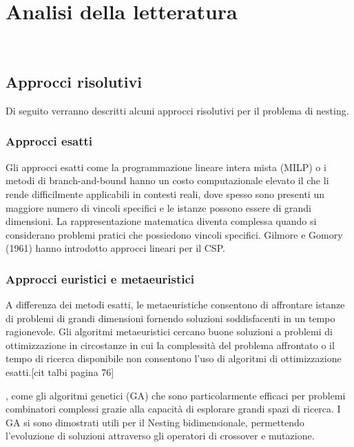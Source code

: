 \chapter{Analisi della letteratura}
\label{cap:descrizione-stage}

\\

\section{Approcci risolutivi}

Di seguito verranno descritti alcuni approcci risolutivi per il problema di nesting. 

\subsection{Approcci esatti}

Gli approcci esatti come la programmazione lineare intera mista (MILP) o i metodi di branch-and-bound hanno un costo computazionale elevato il che li rende difficilmente applicabili in contesti reali, dove spesso sono presenti un maggiore numero di vincoli specifici e le istanze possono essere di grandi dimensioni. La rappresentazione matematica diventa complessa quando si considerano problemi pratici che possiedono vincoli specifici.
Gilmore e Gomory (1961) hanno introdotto approcci lineari per il CSP.

\subsection{Approcci euristici e metaeuristici}

A differenza dei metodi esatti, le metaeuristiche consentono di affrontare istanze di problemi di grandi dimensioni fornendo soluzioni soddisfacenti in un tempo ragionevole. Gli algoritmi metaeuristici cercano buone soluzioni a problemi di ottimizzazione in circostanze in cui la complessità del problema affrontato o il tempo di ricerca disponibile non consentono l'uso di algoritmi di ottimizzazione esatti.[cit talbi pagina 76]


, come gli algoritmi genetici (GA) che sono particolarmente efficaci per problemi combinatori complessi grazie alla capacità di esplorare grandi spazi di ricerca. I GA si sono dimostrati utili per il Nesting bidimensionale, permettendo l'evoluzione di soluzioni attraverso gli operatori di crossover e mutazione.

